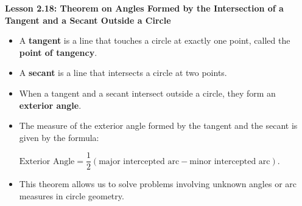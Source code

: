 \begin{center}
\textbf{Lesson 2.18: Theorem on Angles Formed by the Intersection of a Tangent and a Secant Outside a Circle}
\end{center}

\vspace*{-1.5ex}

\begin{itemize}
    \item A \textbf{tangent} is a line that touches a circle at exactly one point, called the \textbf{point of tangency}.
    \item A \textbf{secant} is a line that intersects a circle at two points.
    \item When a tangent and a secant intersect outside a circle, they form an \textbf{exterior angle}.
    \item The measure of the exterior angle formed by the tangent and the secant is given by the formula:

{\centering $
    \text{Exterior Angle} = \dfrac{1}{2} (\text{major intercepted arc} - \text{minor intercepted arc}).
$\par}
    \item This theorem allows us to solve problems involving unknown angles or arc measures in circle geometry.
\end{itemize}
